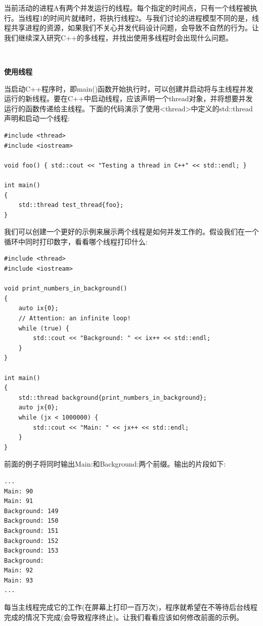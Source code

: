 当前活动的进程A有两个并发运行的线程。每个指定的时间点，只有一个线程被执行。当线程1的时间片就绪时，将执行线程2。与我们讨论的进程模型不同的是，线程共享进程的资源，如果我们不关心并发代码设计问题，会导致不自然的行为。让我们继续深入研究C++的多线程，并找出使用多线程时会出现什么问题。 \par

\noindent\textbf{}\ \par
\textbf{使用线程} \ \par
当启动C++程序时，即main()函数开始执行时，可以创建并启动将与主线程并发运行的新线程。要在C++中启动线程，应该声明一个thread对象，并将想要并发运行的函数传递给主线程。下面的代码演示了使用<thread>中定义的std::thread声明和启动一个线程: \par

\begin{lstlisting}[caption={}]
#include <thread>
#include <iostream>

void foo() { std::cout << "Testing a thread in C++" << std::endl; }

int main()
{
	std::thread test_thread{foo};
}
\end{lstlisting}

我们可以创建一个更好的示例来展示两个线程是如何并发工作的。假设我们在一个循环中同时打印数字，看看哪个线程打印什么: \par

\begin{lstlisting}[caption={}]
#include <thread>
#include <iostream>

void print_numbers_in_background()
{
	auto ix{0};
	// Attention: an infinite loop!
	while (true) {
		std::cout << "Background: " << ix++ << std::endl;
	}
}

int main()
{
	std::thread background{print_numbers_in_background};
	auto jx{0};
	while (jx < 1000000) {
		std::cout << "Main: " << jx++ << std::endl;
	}
}
\end{lstlisting}

前面的例子将同时输出Main:和Background:两个前缀。输出的片段如下: \par

\begin{lstlisting}[caption={}]
...
Main: 90
Main: 91
Background: 149
Background: 150
Background: 151
Background: 152
Background: 153
Background:
Main: 92
Main: 93
...
\end{lstlisting}

每当主线程完成它的工作(在屏幕上打印一百万次)，程序就希望在不等待后台线程完成的情况下完成(会导致程序终止)。让我们看看应该如何修改前面的示例。 \par

